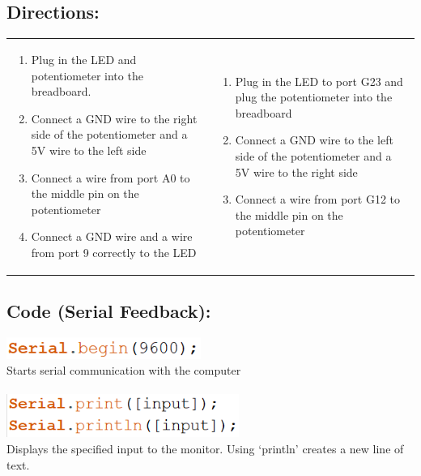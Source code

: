 \documentclass[a4paper,12pt]{report}
\newcommand{\codeHeight}{7mm}
\begin{document}
\subsection*{Directions:}
\begin{center}
    \begin{tabularx}{\textwidth} { 
        | >{\raggedright\arraybackslash}X 
        | >{\raggedright\arraybackslash}X | }
        \hline
        \multicolumn{1}{|c|}{\textbf{Arduino}} & 
        \multicolumn{1}{|c|}{\textbf{ESP32}} \\
        \hline
        \begin{enumerate}
            \item Plug in the LED and potentiometer into the breadboard.
            \item Connect a GND wire to the right side of the potentiometer and a 5V wire to the left side
            \item Connect a wire from port A0 to the middle pin on the potentiometer
            \item Connect a GND wire and a wire from port 9 correctly to the LED
        \end{enumerate} &
        \begin{enumerate}
            \item Plug in the LED to port G23 and plug the potentiometer into the breadboard
            \item Connect a GND wire to the left side of the potentiometer and a 5V wire to the right side
            \item Connect a wire from port G12 to the middle pin on the potentiometer
        \end{enumerate} \\
        \hline
    \end{tabularx}
\end{center}
\subsection*{Code (Serial Feedback):}
    \begin{mdframed}[linewidth = 3, linecolor = turbo_purple]
        \includegraphics[height = \codeHeight]{Assets/begin.png} \\
         Starts serial communication with the computer \\ \\
         \includegraphics[height = 14mm]{Assets/serial.png} \\ 
         Displays the specified input to the monitor. Using ‘println’ creates a new line of text.
    \end{mdframed}
\end{document}
